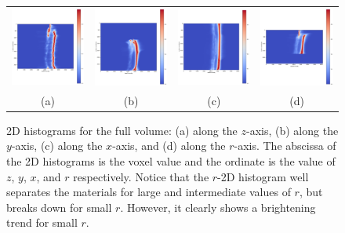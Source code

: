 \begin{figure}
    \centering
    \begin{tabular}{cccc}
        \includegraphics[width=.22\linewidth]{generated/770c_pag_hist_2d_z.pdf} &
        \includegraphics[width=.22\linewidth]{generated/770c_pag_hist_2d_y.pdf} &
        \includegraphics[width=.22\linewidth]{generated/770c_pag_hist_2d_x.pdf} &
        \includegraphics[width=.22\linewidth]{generated/770c_pag_hist_2d_r.pdf} \\
        (a) & (b) & (c) & (d)
    \end{tabular}
    \caption{
        2D histograms for the full volume: (a) along the $z$-axis, (b) along
        the $y$-axis, (c) along the $x$-axis, and (d) along the $r$-axis. The
        abscissa of the 2D histograms is the voxel value and the ordinate is
        the value of $z$, $y$, $x$, and $r$ respectively. Notice that the
        $r$-2D histogram well separates the materials for large and
        intermediate values of $r$, but breaks down for small $r$. However, it
        clearly shows a brightening trend for small $r$.
    }
    \label{fig:2dhists}
\end{figure}

